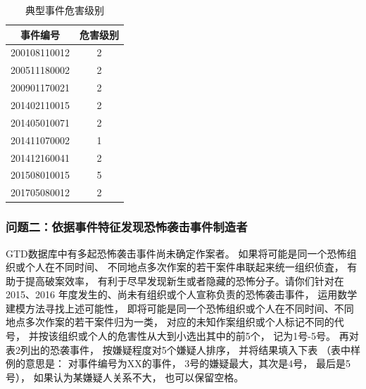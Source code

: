 \documentclass[bwprint]{gmcmthesis}
\begin{document}
\begin{table}
\centering
\caption{典型事件危害级别}
\begin{tabular}{|c|c|}
  \hline
  事件编号 & 危害级别 \\
  \hline
  200108110012 & 2  \\
  \hline
  200511180002 & 2 \\
  \hline
  200901170021 & 2 \\
  \hline
  201402110015 & 2 \\
  \hline
  201405010071 & 2 \\
  \hline
  201411070002 & 1  \\
  \hline
  201412160041 & 2  \\
  \hline
  201508010015 & 5  \\
  \hline
  201705080012 & 2  \\
  \hline
\end{tabular}
\end{table}


\subsubsection{问题二：依据事件特征发现恐怖袭击事件制造者}

GTD数据库中有多起恐怖袭击事件尚未确定作案者。
如果将可能是同一个恐怖组织或个人在不同时间、
不同地点多次作案的若干案件串联起来统一组织侦査，
有助于提高破案效率，
有利于尽早发现新生或者隐藏的恐怖分子。请你们针对在
2015、2016 年度发生的、尚未有组织或个人宣称负责的恐怖袭击事件，
运用数学建模方法寻找上述可能性，
即将可能是同一个恐怖组织或个人在不同时间、不同地点多次作案的若干案件归为一类，
对应的未知作案组织或个人标记不同的代号，
并按该组织或个人的危害性从大到小选出其中的前5个，
记为1号-5号。
再对表2列出的恐袭事件，
按嫌疑程度对5个嫌疑人排序，
并将结果填入下表
（表中样例的意思是：
对事件编号为XX的事件，
3号的嫌疑最大，其次是4号，
最后是5号），
如果认为某嫌疑人关系不大，
也可以保留空格。
\end{document}
